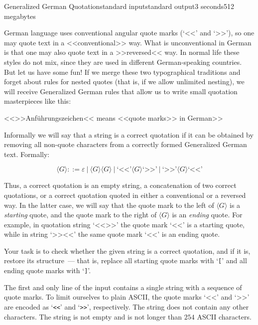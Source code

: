 \begin{problem}{Generalized German Quotation}{standard input}{standard output}{3 seconds}{512 megabytes}

German language uses conventional angular quote marks (`<<' and `>>'), so one may quote 
text in a <<conventional>> way. 
What is unconventional in German is that one may also quote text in a >>reversed<< way.
In normal life these styles do not mix, since they are used in different 
German-speaking countries. 
But let us have some fun! If we merge these two typographical traditions and forget about rules for nested quotes (that is, if we allow unlimited nesting), we will receive Generalized German rules that allow us to write small quotation masterpieces like this:

\begin{center}
<<>>Anführungszeichen<< means <<quote marks>> in German>>
\end{center}

Informally we will say that a string is a correct quotation if it can be obtained by removing all non-quote characters from a correctly formed Generalized German text. Formally:

$$\langle G \rangle ::= \varepsilon\ |\ \langle G \rangle \langle G \rangle\ |\ 
\textrm{`<<'} \langle G \rangle \textrm{`>>'}\ |\ \textrm{`>>'} \langle G \rangle \textrm{`<<'}$$


Thus, a correct quotation is an empty string, a concatenation of two correct quotations, or a correct quotation quoted in either a conventional or a reversed way. In the latter case, we will say that the quote mark to the left of $\langle G \rangle$ is a \textit{starting} quote, and the quote mark to the right of $\langle G \rangle$ is an \textit{ending} quote. For example, in quotation string `<<>>' the quote mark `<<' is a starting quote, while in string `>><<' the same quote mark `<<' is an ending quote.

Your task is to check whether the given string is a correct quotation, and if it is, restore its structure~--- that is, replace all starting quote marks with `\verb![!' and all ending quote marks with `\verb!]!'.


\InputFile
The first and only line of the input contains a single string with a sequence of quote marks. To limit ourselves to plain ASCII, the quote marks `<<' and `>>'
are encoded as `\verb!<<!' and `\verb!>>!', respectively. The string does not contain
any other characters. The string is not empty and is not longer than $254$ ASCII characters.


\end{problem}
